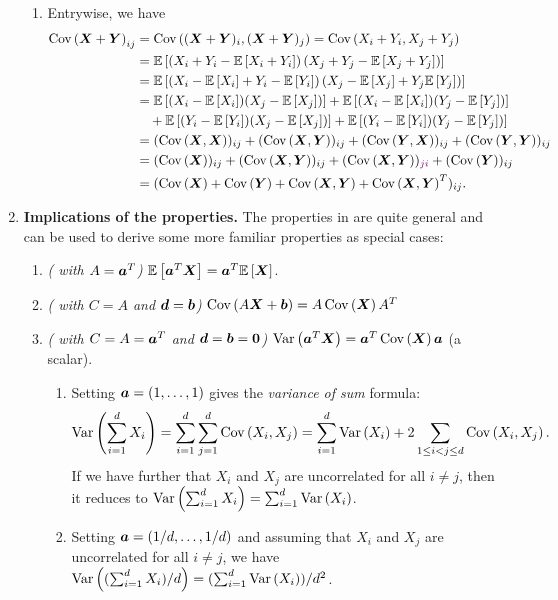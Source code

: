 \begin{enumerate}
\begin{pf}
\begin{enumerate}
\item Entrywise, we have
\begin{align*}
\cov{\vect{X}+\vect{Y}}_{ij}&=\cov{(\vect{X}+\vect{Y})_{i},(\vect{X}+\vect{Y})_{j}}
=\cov{X_i+Y_i,X_j+Y_j} \\
&=\expv{\left(X_i+Y_i-\expv{X_i+Y_i}\right)\left(X_j+Y_j-\expv{X_j+Y_j}\right)} \\
&=\expv{\left(X_i-\expv{X_i}+Y_i-\expv{Y_i}\right)\left(X_j-\expv{X_j}+Y_j\expv{Y_j}\right)} \\
&=\expv{(X_i-\expv{X_i})(X_j-\expv{X_j})}+\expv{(X_i-\expv{X_i})(Y_j-\expv{Y_j})} \\
&\quad+\expv{(Y_i-\expv{Y_i})(X_j-\expv{X_j})}+\expv{(Y_i-\expv{Y_i})(Y_j-\expv{Y_j})} \\
&=(\cov{\vect{X},\vect{X}})_{ij}+(\cov{\vect{X},\vect{Y}})_{ij}+(\cov{\vect{Y},\vect{X}})_{ij}
+(\cov{\vect{Y},\vect{Y}})_{ij} \\
&=(\cov{\vect{X}})_{ij}+(\cov{\vect{X},\vect{Y}})_{ij}+(\cov{\vect{X},\vect{Y}})_{\vc{ji}}
+(\cov{\vect{Y}})_{ij} \\
&=(\cov{\vect{X}}+\cov{\vect{Y}}
+\cov{\vect{X},\vect{Y}}+\cov{\vect{X},\vect{Y}}^{T})_{ij}.
\end{align*}
\end{enumerate}
\end{pf}
\item \textbf{Implications of the properties.} The properties in
 are quite general and can be used to
derive some more familiar properties as special cases:
\begin{enumerate}
\item \emph{( with \(A=\bm{a}^{T}\))}
\(\mathbb{E}\left[\bm{a}^{T}\bm{X}\right]=\bm{a}^{T}\mathbb{E}\left[\bm{X}\right]\).
\item \emph{( with \(C=A\) and \(\bm{d}=\bm{b}\))}
\(\operatorname{Cov}\left(A\bm{X}+\bm{b}\right)=A\operatorname{Cov}\left(\bm{X}\right)A^{T}\)
\item \emph{( with \(C=A=\bm{a}^{T}\) and \(\bm{d}=\bm{b}=\bm{0}\))}
\(\operatorname{Var}\left(\bm{a}^{T}\bm{X}\right)=\bm{a}^{T}\operatorname{Cov}\left(\bm{X}\right)\bm{a}\) (a scalar).
\begin{enumerate}
\item Setting \(\bm{a}=(1,\dotsc,1)\) gives the \emph{variance of sum} formula:
\[
\operatorname{Var}\left(\sum_{i=1}^{d}X_i\right)=\sum_{i=1}^{d}\sum_{j=1}^{d}\operatorname{Cov}\left(X_i,X_j\right)
=\sum_{i=1}^{d}\operatorname{Var}\left(X_i\right)+2\sum_{1\le i<j\le d}^{}\operatorname{Cov}\left(X_{i},X_{j}\right).
\]
If we have further that \(X_i\) and \(X_j\) are uncorrelated for all
\(i\ne j\), then it reduces to \(\operatorname{Var}\left(\sum_{i=1}^{d}X_i\right)=\sum_{i=1}^{d}\operatorname{Var}\left(X_i\right)\).
\item Setting \(\bm{a}=(1/d,\dotsc,1/d)\) and assuming that \(X_i\) and \(X_j\)
are uncorrelated for all \(i\ne j\), we have \(\operatorname{Var}\left((\sum_{i=1}^{d}X_i)/d\right)
=(\sum_{i=1}^{d}\operatorname{Var}\left(X_i\right))/d^{2}\).


\end{enumerate}
\end{enumerate}
\end{enumerate}

